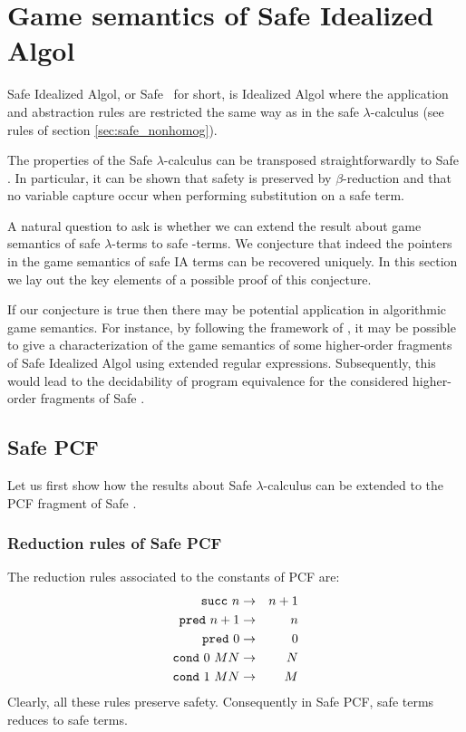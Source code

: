 \section{Game semantics of Safe Idealized Algol}

Safe Idealized Algol, or Safe \ialgol\ for short, is Idealized Algol where the application and abstraction rules are restricted
the same way as in the safe $\lambda$-calculus (see rules of section \ref{sec:safe_nonhomog}).

The properties of the Safe $\lambda$-calculus can be transposed straightforwardly to Safe \ialgol.
In particular, it can be shown that safety is preserved by $\beta$-reduction and that
no variable capture occur when performing substitution on a safe term.

A natural question to ask is whether we can extend the result about game semantics of safe $\lambda$-terms to safe \ialgol-terms.
We conjecture that indeed the pointers in the game semantics of safe IA terms can be recovered uniquely.
In this section we lay out the key elements of a possible proof of this conjecture.

If our conjecture is true then there may be potential application in algorithmic game semantics.
For instance, by following the framework of \cite{ghicamccusker00}, it may be possible to give
a characterization of the game semantics of some higher-order fragments of Safe Idealized Algol using
extended regular expressions.
Subsequently, this would lead to the decidability of program equivalence
for the considered higher-order fragments of Safe \ialgol.

\subsection{Safe PCF}
Let us first show how the results about Safe $\lambda$-calculus can be extended to the PCF fragment of Safe \ialgol.


\subsubsection{Reduction rules of Safe PCF}

The reduction rules associated to the constants of PCF are:
\begin{eqnarray*}
\texttt{succ}\ n &\rightarrow& n+1 \\
\texttt{pred}\ n+1 &\rightarrow& n \\
\texttt{pred}\ 0 &\rightarrow& 0 \\
\texttt{cond}\ 0\ M N &\rightarrow& N \\
\texttt{cond}\ 1\ M N &\rightarrow& M
\end{eqnarray*}
Clearly, all these rules preserve safety. Consequently in Safe PCF, safe terms reduces to safe terms.

